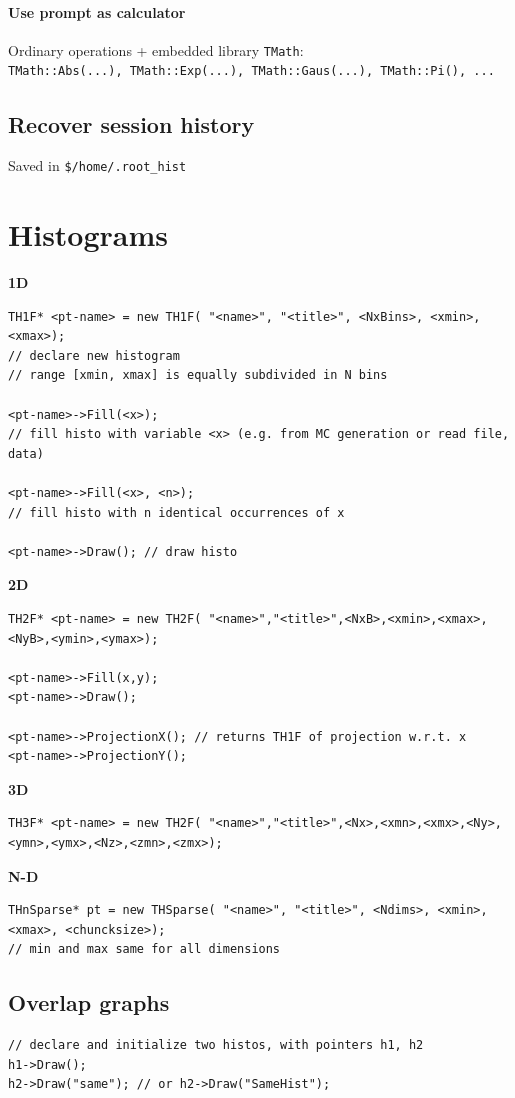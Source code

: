 \documentclass[10pt, oneside]{article}
\begin{document}
\paragraph{Use prompt as calculator}
Ordinary operations + embedded library \texttt{TMath}:
\\\texttt{TMath::Abs(...), TMath::Exp(...), TMath::Gaus(...), TMath::Pi(), ...}
\subsection{Recover session history}
Saved in \texttt{\$/home/.root\_hist}

\section{Histograms}
\textbf{1D}
\begin{verbatim}
TH1F* <pt-name> = new TH1F( "<name>", "<title>", <NxBins>, <xmin>, <xmax>);
// declare new histogram
// range [xmin, xmax] is equally subdivided in N bins

<pt-name>->Fill(<x>); 
// fill histo with variable <x> (e.g. from MC generation or read file, data)

<pt-name>->Fill(<x>, <n>);
// fill histo with n identical occurrences of x

<pt-name>->Draw(); // draw histo
\end{verbatim}
\textbf{2D}
\begin{verbatim}
TH2F* <pt-name> = new TH2F( "<name>","<title>",<NxB>,<xmin>,<xmax>,<NyB>,<ymin>,<ymax>);

<pt-name>->Fill(x,y);
<pt-name>->Draw();

<pt-name>->ProjectionX(); // returns TH1F of projection w.r.t. x
<pt-name>->ProjectionY();
\end{verbatim}
\textbf{3D}
\begin{verbatim}
TH3F* <pt-name> = new TH2F( "<name>","<title>",<Nx>,<xmn>,<xmx>,<Ny>,<ymn>,<ymx>,<Nz>,<zmn>,<zmx>);
\end{verbatim}
\textbf{N-D}
\begin{verbatim}
THnSparse* pt = new THSparse( "<name>", "<title>", <Ndims>, <xmin>, <xmax>, <chuncksize>); 
// min and max same for all dimensions
\end{verbatim}

\subsection{Overlap graphs}
\begin{verbatim}
// declare and initialize two histos, with pointers h1, h2
h1->Draw();
h2->Draw("same"); // or h2->Draw("SameHist");
\end{verbatim}
\end{document}

